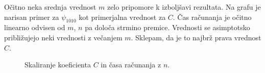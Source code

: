 \documentclass[a4paper]{article}
\begin{document}
Očitno neka srednja vrednost $m$ zelo pripomore k izboljšavi rezultata. Na grafu je narisan primer za $\psi_{1010}$ kot primerjalna vrednost
za $C$. Čas računanja je očitno linearno odvisen od $m$, $n$ pa določa strmino premice. Vrednosti se asimptotsko približujejo neki vrednosti
z večanjem $m$. Sklepam, da je to najbrž prava vrednost $C$.

\begin{figure}[H]
    \centering
    \caption{Skaliranje koeficienta $C$ in časa računanja z $n$.}
\end{figure}
\end{document}
